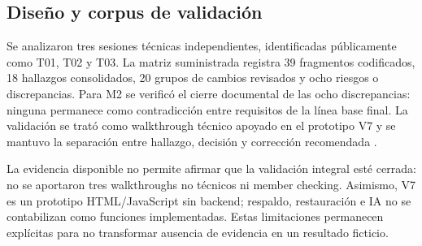 
\subsection{Diseño y corpus de validación}
Se analizaron tres sesiones técnicas independientes, identificadas públicamente como T01, T02 y T03. La matriz suministrada registra 39 fragmentos codificados, 18 hallazgos consolidados, 20 grupos de cambios revisados y ocho riesgos o discrepancias. Para M2 se verificó el cierre documental de las ocho discrepancias: ninguna permanece como contradicción entre requisitos de la línea base final. La validación se trató como walkthrough técnico apoyado en el prototipo V7 y se mantuvo la separación entre hallazgo, decisión y corrección recomendada \cite{sem11}.

\begin{alertbox}
La evidencia disponible no permite afirmar que la validación integral esté cerrada: no se aportaron tres walkthroughs no técnicos ni member checking. Asimismo, V7 es un prototipo HTML/JavaScript sin backend; respaldo, restauración e IA no se contabilizan como funciones implementadas. Estas limitaciones permanecen explícitas para no transformar ausencia de evidencia en un resultado ficticio.
\end{alertbox}


